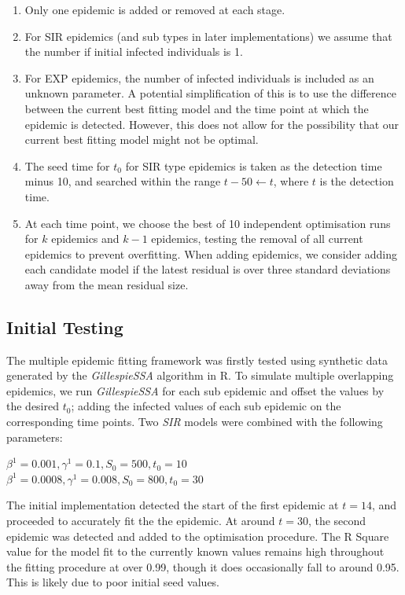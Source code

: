 \begin{enumerate}
\item Only one epidemic is added or removed at each stage.
\item For SIR epidemics (and sub types in later implementations) we assume that the number if initial infected
  individuals is 1. 
\item For EXP epidemics, the number of infected individuals is
  included as an unknown parameter. A potential simplification of this
  is to use the difference between the current best fitting model and
  the time point at which the epidemic is detected. However, this
  does not allow for the possibility that our current best fitting
  model might not be optimal.
\item The seed time for $t_0$ for SIR type epidemics is taken as the
  detection time minus 10, and searched within the range
  $t-50\leftarrow t$, where $t$ is the detection time.
\item At each time point, we choose the best of 10 independent
  optimisation runs for $k$ epidemics and $k-1$ epidemics, testing the
  removal of all current epidemics to prevent overfitting. When adding
  epidemics, we consider adding each candidate model if the latest
  residual is over three standard deviations away from the mean residual size.
\end{enumerate}

\subsection{Initial Testing}
The multiple epidemic fitting framework was firstly tested using
synthetic data generated by the \emph{GillespieSSA} algorithm in R. To
simulate multiple overlapping epidemics, we run \emph{GillespieSSA}
for each sub epidemic and offset the values by the desired $t_0$;
adding the infected values of each sub epidemic on the corresponding
time points. Two \emph{SIR} models were combined with the following
parameters:

$\beta^1=0.001, \gamma^1 = 0.1, S_0 = 500, t_0 = 10$\\
$\beta^1=0.0008, \gamma^1 = 0.008, S_0 = 800, t_0 = 30$

The initial implementation detected the start of the first epidemic at
$t = 14$, and proceeded to accurately fit the the epidemic. At around
$t = 30$, the second epidemic was detected and added to the
optimisation procedure. The R Square value for the model fit to the
currently known values remains high throughout the fitting procedure
at over 0.99, though it does occasionally fall to around 0.95. This is
likely due to poor initial seed values.

